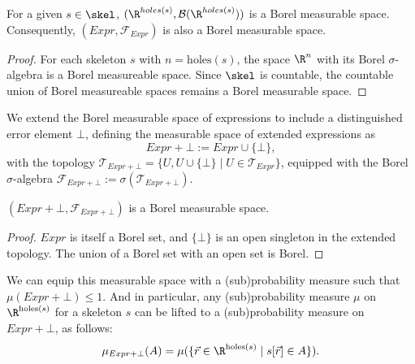 \begin{lemma}
	For a given $s \in \skel$, $(\R^{holes(s)}, \mathcal{B}(\R^{holes(s)}))$ is a Borel measurable space. Consequently, $(Expr, \mathcal{F}_{Expr})$ is also a Borel measurable space.
\end{lemma}

\begin{proof}
	For each skeleton $s$ with $n = \text{holes}(s)$, the space $\R^n$ with its Borel $\sigma$-algebra is a Borel measureable space. Since $\skel$ is countable, the countable union of Borel measureable spaces remains a Borel measurable space. 
\end{proof}

\begin{definition}\label{def:meas-space-with-error}
	We extend the Borel measurable space of expressions to include a distinguished error element $\bot$, defining the measurable space of extended expressions as
	\[
		Expr + \bot := Expr \cup \{\bot\},
	\]
	with the topology $\mathcal{T}_{Expr + \bot} = \{U, U \cup \{\bot\} \mid U \in \mathcal{T}_{Expr}\}$, equipped with the Borel $\sigma$-algebra $\mathcal{F}_{Expr + \bot} := \sigma(\mathcal{T}_{Expr + \bot})$.
\end{definition}

\begin{lemma}
	$(Expr + \bot, \mathcal{F}_{Expr + \bot})$ is a Borel measurable space.
\end{lemma}

\begin{proof}
	$Expr$ is itself a Borel set, and $\{\bot\}$ is an open singleton in the extended topology. The union of a Borel set with an open set is Borel. 
\end{proof}


We can equip this measurable space with a (sub)probability measure such that $\mu(Expr + \bot) \leq 1$. And in particular, any (sub)probability measure $\mu$ on $\R^{\text{holes}(s)}$ for a skeleton $s$ can be lifted to a (sub)probability measure on $Expr + \bot$, as follows: 
\[
	\mu_{Expr + \bot}(A) = \mu(\{\vec{r} \in \R^{\text{holes}(s)} \mid s[\vec{r}] \in A\}).
\]


